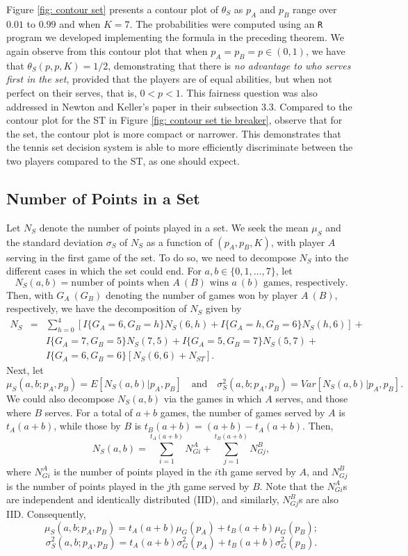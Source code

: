 \documentclass[11pt]{article}
\theoremstyle{plain}
\theoremstyle{definition}
\begin{document}
Figure \ref{fig: contour set} presents a contour plot of $\theta_{S}$ as $p_A$ and $p_B$ range over $0.01$ to $0.99$ and when $K = 7$. The probabilities were computed using an {\tt R} program we developed implementing the formula in the preceding theorem.
%
We again observe from this contour plot that when $p_A = p_B = p \in (0,1)$, we have that $\theta_S(p,p,K) = 1/2$, demonstrating that there is {\em no advantage to who serves first in the set}, provided that the players are of equal abilities, but when not perfect on their serves, that is, $0 < p < 1$. This fairness question was also addressed in Newton and Keller's paper \cite{Newton_Keller_2005} in their subsection 3.3. Compared to the contour plot for the ST in Figure \ref{fig: contour set tie breaker}, observe that for the set, the contour plot is more compact or narrower. This demonstrates that the tennis set decision system is able to more efficiently discriminate between the two players compared to the ST, as one should expect.


\subsection{Number of Points in a Set}

Let $N_S$ denote the number of points played in a set. We seek the mean $\mu_S$ and the standard deviation $\sigma_S$ of $N_S$ as a function of $(p_A,p_B,K)$, with player $A$ serving in the first game of the set. To do so, we need to decompose $N_S$ into the different cases in which the set could end. For $a,b \in \{0,1,\ldots,7\}$, let
%
$$N_S(a,b) = \mbox{number of points when $A\ (B)$ wins $a\ (b)$ games, respectively.}$$
%
Then, with $G_A\ (G_B)$ denoting the number of games won by player $A\ (B)$, respectively, we have the decomposition of $N_S$ given by
%
\begin{eqnarray*}
    N_S & = & \sum_{h=0}^4 \left[I\{G_A = 6,G_B = h\} N_S(6,h) + I\{G_A = h,G_B = 6\} N_S(h,6) \right] + \\
   && I\{G_A=7,G_B=5\} N_S(7,5) + I\{G_A=5,G_B=7\} N_S(5,7) + \\ && I\{G_A=6,G_B=6\} \left[N_S(6,6) + N_{ST}\right].
\end{eqnarray*}
%
Next, let
%
$$\mu_S(a,b; p_A,p_B) = E[N_S(a,b)|p_A,p_B] \quad \mbox{and} \quad
\sigma_S^2(a,b; p_A,p_B) = Var[N_S(a,b)|p_A,p_B].$$
%
We could also decompose $N_S(a,b)$ via the games in which $A$ serves, and those where $B$ serves. For a total of $a+b$ games, the number of games served by $A$ is $t_A(a+b)$, while those by $B$ is $t_B(a+b) = (a+b) - t_A(a+b)$. Then,
%
$$N_S(a,b) = \sum_{i=1}^{t_A(a+b)} N_{Gi}^A + \sum_{j=1}^{t_B(a+b)} N_{Gj}^B,$$
%
where $N_{Gi}^A$ is the number of points played in the $i$th game served by $A$, and $N_{Gj}^B$ is the number of points played in the $j$th game served by $B$. Note that the $N_{Gi}^A$s are independent and identically distributed (IID), and similarly, $N_{Gj}^B$s are also IID. Consequently,
%
$$\mu_S(a,b;p_A,p_B) = t_A(a+b) \mu_G(p_A) + t_B(a+b) \mu_G(p_B);$$
$$\sigma_S^2(a,b;p_A,p_B) =  t_A(a+b) \sigma_G^2(p_A) + t_B(a+b) \sigma_G^2(p_B).$$
%
\end{document}
